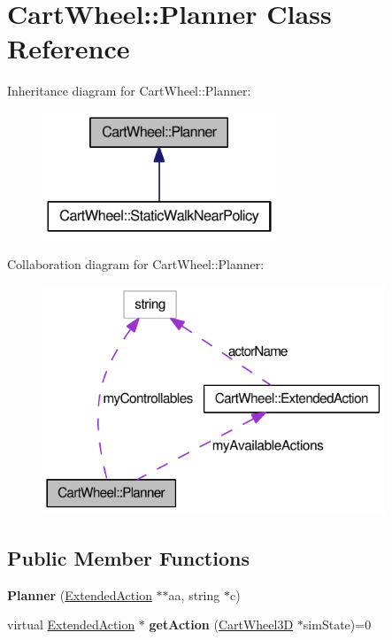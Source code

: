 \hypertarget{classCartWheel_1_1Planner}{
\section{CartWheel::Planner Class Reference}
\label{classCartWheel_1_1Planner}
}


Inheritance diagram for CartWheel::Planner:\nopagebreak
\begin{figure}[H]
\begin{center}
\leavevmode
\includegraphics[width=198pt]{classCartWheel_1_1Planner__inherit__graph}
\end{center}
\end{figure}


Collaboration diagram for CartWheel::Planner:\nopagebreak
\begin{figure}[H]
\begin{center}
\leavevmode
\includegraphics[width=290pt]{classCartWheel_1_1Planner__coll__graph}
\end{center}
\end{figure}
\subsection*{Public Member Functions}
\begin{DoxyCompactItemize}
\item 
\hypertarget{classCartWheel_1_1Planner_ae7ee89fd793f9869ac3dd90af26cf7ec}{
{\bfseries Planner} (\hyperlink{classCartWheel_1_1ExtendedAction}{ExtendedAction} $\ast$$\ast$aa, string $\ast$c)}
\label{classCartWheel_1_1Planner_ae7ee89fd793f9869ac3dd90af26cf7ec}

\item 
\hypertarget{classCartWheel_1_1Planner_a7e578217a70e65a8c33d70c6923d6d2e}{
virtual \hyperlink{classCartWheel_1_1ExtendedAction}{ExtendedAction} $\ast$ {\bfseries getAction} (\hyperlink{classCartWheel_1_1CartWheel3D}{CartWheel3D} $\ast$simState)=0}
\label{classCartWheel_1_1Planner_a7e578217a70e65a8c33d70c6923d6d2e}

\end{DoxyCompactItemize}

